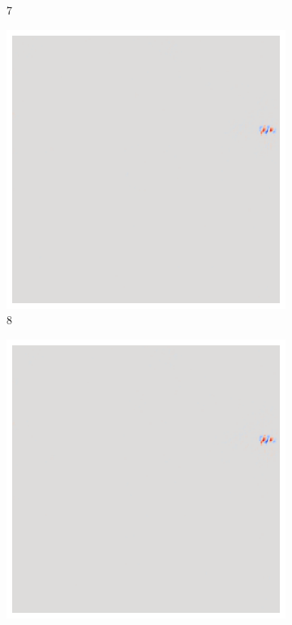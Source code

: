 \begin{figure}[ht!]
\begin{subfigure}{0.095\linewidth}
        \caption{7}
    \end{subfigure}\hfill%
    \begin{subfigure}{0.095\linewidth}
        \centering
        \includegraphics[height=1\linewidth]{01-images/05-resultate/uap_resnet/uap0-resnet18-covid-n200-robustificationslevel8.png}
        \caption{8}
    \end{subfigure}\hfill%
    \begin{subfigure}{0.095\linewidth}
        \centering
        \includegraphics[height=1\linewidth]{01-images/05-resultate/uap_resnet/uap0-resnet18-covid-n200-robustificationslevel9.png}

\end{subfigure}
\end{figure}
